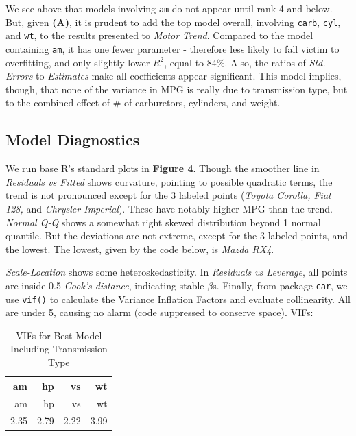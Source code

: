 \documentclass[]{article}
\newenvironment{Shaded}{\begin{snugshade}}{\end{snugshade}}
\newcommand{\KeywordTok}[1]{\textcolor[rgb]{0.13,0.29,0.53}{\textbf{{#1}}}}
\newcommand{\StringTok}[1]{\textcolor[rgb]{0.31,0.60,0.02}{{#1}}}
\newcommand{\NormalTok}[1]{{#1}}
\begin{document}
We see above that models involving \texttt{am} do not appear until rank
4 and below. But, given \textbf{(A)}, it is prudent to add the top model
overall, involving \texttt{carb}, \texttt{cyl}, and \texttt{wt}, to the
results presented to \emph{Motor Trend}. Compared to the model
containing \texttt{am}, it has one fewer parameter - therefore less
likely to fall victim to overfitting, and only slightly lower \(R^2\),
equal to 84\%. Also, the ratios of \emph{Std. Errors} to
\emph{Estimates} make all coefficients appear significant. This model
implies, though, that none of the variance in MPG is really due to
transmission type, but to the combined effect of \# of carburetors,
cylinders, and weight.

\subsection{Model Diagnostics}\label{model-diagnostics}

We run base R's standard plots in \textbf{Figure 4}. Though the smoother
line in \emph{Residuals vs Fitted} shows curvature, pointing to possible
quadratic terms, the trend is not pronounced except for the 3 labeled
points (\emph{Toyota Corolla, Fiat 128,} and \emph{Chrysler Imperial}).
These have notably higher MPG than the trend. \emph{Normal Q-Q} shows a
somewhat right skewed distribution beyond 1 normal quantile. But the
deviations are not extreme, except for the 3 labeled points, and the
lowest. The lowest, given by the code below, is \emph{Mazda RX4}.

\begin{Shaded}
\end{Shaded}

\emph{Scale-Location} shows some heteroskedasticity. In \emph{Residuals
vs Leverage}, all points are inside 0.5 \emph{Cook's distance},
indicating stable \(\beta\)s. Finally, from package \texttt{car}, we use
\texttt{vif()} to calculate the Variance Inflation Factors and evaluate
collinearity. All are under 5, causing no alarm (code suppressed to
conserve space). VIFs:

\begin{longtable}[]{@{}rrrr@{}}
\caption{VIFs for Best Model Including Transmission Type}\tabularnewline
\toprule
am & hp & vs & wt\tabularnewline
\midrule
\endfirsthead
\toprule
am & hp & vs & wt\tabularnewline
\midrule
\endhead
2.35 & 2.79 & 2.22 & 3.99\tabularnewline
\bottomrule
\end{longtable}
\end{document}
